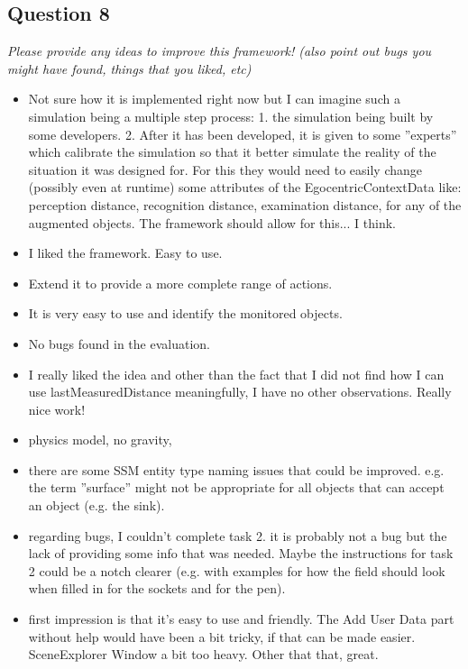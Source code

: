 \subsection{Question 8}\label{question2:8}
\emph{Please provide any ideas to improve this framework! (also point out bugs you might have found, things that you liked, etc)}

\begin{itemize}
	\item Not sure how it is implemented right now but I can imagine such a simulation being a multiple step process: 1. the simulation being built by some developers. 2. After it has been developed, it is given to some ''experts'' which calibrate the simulation so that it better simulate the reality of the situation it was designed for. For this they would need to easily change (possibly even at runtime) some attributes of the EgocentricContextData like: perception distance, recognition distance, examination distance, for any of the augmented objects. The framework should allow for this... I think.
	\item I liked the framework. Easy to use.
	\item Extend it to provide a more complete range of actions.
	\item It is very easy to use and identify the monitored objects.
	\item No bugs found in the evaluation.
	\item I really liked the idea and other than the fact that I did not find how I can use lastMeasuredDistance meaningfully, I have no other observations. Really nice work!
	\item physics model, no gravity,
	\item there are some SSM entity type naming issues that could be improved. e.g. the term ''surface'' might not be appropriate for all objects that can accept an object (e.g. the sink).
	\item regarding bugs, I couldn't complete task 2. it is probably not a bug but the lack of providing some info that was needed. Maybe the instructions for task 2 could be a notch clearer (e.g. with examples for how the field should look when filled in for the sockets and for the pen).
	\item first impression is that it's easy to use and friendly. The Add User Data part without help would have been a bit tricky, if that can be made easier. SceneExplorer Window a bit too heavy. Other that that, great.

\end{itemize}
